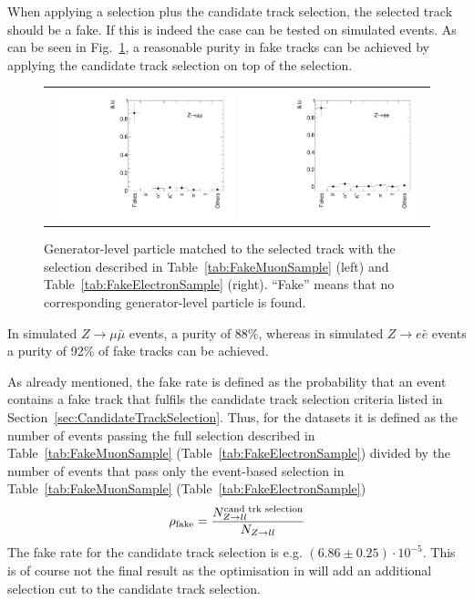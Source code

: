 When applying a \Zlep selection plus the candidate track selection, the selected track should be a fake.
If this is indeed the case can be tested on simulated \Zlep events.
As can be seen in Fig.~\ref{fig:BkgComposition}, a reasonable purity in fake tracks can be achieved by applying the candidate track selection on top of the \Zlep selection.
\begin{figure}[!b]
  \centering 
  \begin{tabular}{c}
    \includegraphics[width=0.49\textwidth]{figures/analysis/Background/ParticleCompositionInFakeCS_Mu.pdf}
    \includegraphics[width=0.49\textwidth]{figures/analysis/Background/ParticleCompositionInFakeCS_Ele.pdf}
  \end{tabular}
  \caption{Generator-level particle matched to the selected track with the selection described in Table~\ref{tab:FakeMuonSample} (left) and Table~\ref{tab:FakeElectronSample} (right). 
           ``Fake'' means that no corresponding generator-level particle is found. }
  \label{fig:BkgComposition}
\vspace{30pt}
\end{figure}
In simulated $Z\rightarrow\mu\bar{\mu}$ events, a purity of 88\%, whereas in simulated $Z\rightarrow e\bar{e}$ events a purity of 92\% of fake tracks can be achieved.


As already mentioned, the fake rate is defined as the probability that an event contains a fake track that fulfils the candidate track selection criteria listed in Section~\ref{sec:CandidateTrackSelection}.
Thus, for the \Zlep datasets it is defined as the number of events passing the full selection described in Table~\ref{tab:FakeMuonSample} (Table~\ref{tab:FakeElectronSample}) divided by the number of events that pass only the event-based selection in Table~\ref{tab:FakeMuonSample} (Table~\ref{tab:FakeElectronSample})
\begin{equation*}
\rho_{\text{fake}} = \frac{N_{Z\rightarrow ll}^{\text{cand trk selection}}}{N_{Z\rightarrow ll}}
\end{equation*}
The fake rate for the candidate track selection is e.g. $\left( 6.86 \pm 0.25 \right) \cdot 10^{-5}$. 
This is of course not the final result as the optimisation in \pt will add an additional \pt selection cut to the candidate track selection.

